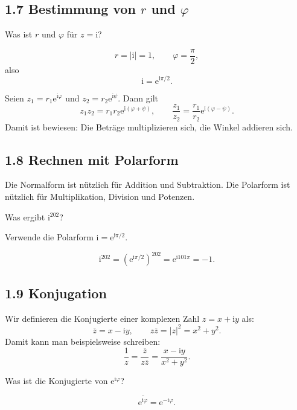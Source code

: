\documentclass[11pt,a4paper]{article}
\newcommand{\ii}{\mathrm i}
\newcommand{\ee}{\mathrm e}
\begin{document}
\subsection{1.7 Bestimmung von $r$ und $\varphi$}
\begin{fragebox}
Was ist $r$ und $\varphi$ für $z=\ii$?
\end{fragebox}
\begin{antwortbox}
\[
r=|\ii|=1,\qquad \varphi=\frac\pi2,
\]
also
\[
\ii=\ee^{\ii\pi/2}.
\]
\end{antwortbox}

Seien $z_1=r_1\ee^{\ii\varphi}$ und $z_2=r_2\ee^{\ii\psi}$. Dann gilt
\[
 z_1z_2=r_1r_2\ee^{\ii(\varphi+\psi)},
\qquad
 \frac{z_1}{z_2}=\frac{r_1}{r_2}\ee^{\ii(\varphi-
\psi)}.
\]
Damit ist bewiesen: Die Beträge multiplizieren sich, die Winkel addieren sich.

\subsection{1.8 Rechnen mit Polarform}
Die Normalform ist nützlich für Addition und Subtraktion. Die Polarform ist nützlich für Multiplikation, Division und Potenzen.

\begin{fragebox}
Was ergibt $\ii^{202}$?
\end{fragebox}
\begin{tippbox}
Verwende die Polarform $\ii=\ee^{\ii\pi/2}$.
\end{tippbox}
\begin{antwortbox}
\[
\ii^{202}=\left(\ee^{\ii\pi/2}\right)^{202}=\ee^{\ii 101\pi}=-1.
\]
\end{antwortbox}

\subsection{1.9 Konjugation}
Wir definieren die Konjugierte einer komplexen Zahl $z=x+\ii y$ als:
\[
 \overline z=x-\ii y,\qquad z\overline z=|z|^2=x^2+y^2.
\]
Damit kann man beispielsweise schreiben:
\[
 \frac{1}{z}=\frac{\overline z}{z\overline z}=\frac{x-\ii y}{x^2+y^2}.
\]

\begin{fragebox}
Was ist die Konjugierte von $\ee^{\ii\varphi}$?
\end{fragebox}
\begin{antwortbox}
\[
\overline{\ee^{\ii\varphi}}=\ee^{-\ii\varphi}.
\]
\end{antwortbox}
\end{document}
